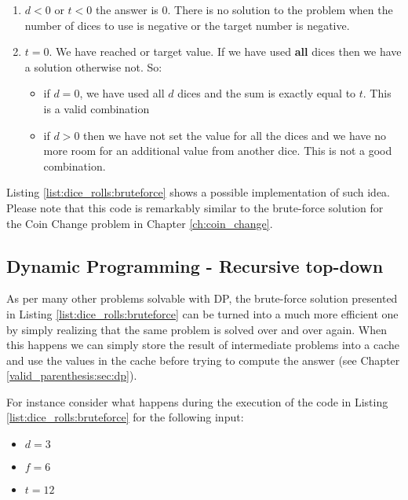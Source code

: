 \begin{enumerate}
	\item $d<0$ or $t<0$ the answer is $0$. There is no solution to the problem when the number of dices to use is negative or the target number is negative.
	\item $t=0$. We have reached or target value. If we have used \textbf{all} dices then we have a solution otherwise not. So:
	\begin{itemize}
		\item if $d=0$, we have used all $d$ dices and the sum is exactly equal to $t$. This is a valid combination
		\item if $d>0$ then we have not set the value for all the dices and we have no more room for an additional value from another dice. This is not a good combination.
	\end{itemize}
\end{enumerate}


Listing \ref{list:dice_rolls:bruteforce} shows a possible implementation of such idea. Please note that this code is remarkably similar to the brute-force solution  for the Coin Change problem in Chapter \ref{ch:coin_change}.




\subsection{Dynamic Programming - Recursive top-down}
\label{dice_rolls:sec:DP}

As per many other problems solvable with DP, the brute-force solution presented in Listing \ref{list:dice_rolls:bruteforce} can be turned into a much more efficient one by simply realizing that the same problem is solved over and over again. When this happens we can simply store the result of intermediate problems into a cache and use the values in the cache before trying to compute the answer (see Chapter \ref{valid_parenthesis:sec:dp}). 

For instance consider what happens during the execution of the code in Listing \ref{list:dice_rolls:bruteforce} for the following input:
\begin{itemize}
	\item $d = 3$
	\item $f = 6$
	\item $t = 12$
\end{itemize}

